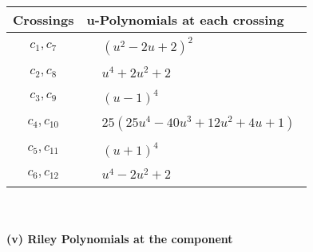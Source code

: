 \documentclass[1p]{elsarticle_modified}
\theoremstyle{definition}
\begin{document}
\begin{tabular}{m{50pt}|m{274pt}}
Crossings & \hspace{64pt}u-Polynomials at each crossing \\
\hline $$\begin{aligned}c_{1},c_{7}\end{aligned}$$&$\begin{aligned}
&(u^2-2 u+2)^2
\end{aligned}$\\
\hline $$\begin{aligned}c_{2},c_{8}\end{aligned}$$&$\begin{aligned}
&u^4+2 u^2+2
\end{aligned}$\\
\hline $$\begin{aligned}c_{3},c_{9}\end{aligned}$$&$\begin{aligned}
&(u-1)^4
\end{aligned}$\\
\hline $$\begin{aligned}c_{4},c_{10}\end{aligned}$$&$\begin{aligned}
&25(25 u^4-40 u^3+12 u^2+4 u+1)
\end{aligned}$\\
\hline $$\begin{aligned}c_{5},c_{11}\end{aligned}$$&$\begin{aligned}
&(u+1)^4
\end{aligned}$\\
\hline $$\begin{aligned}c_{6},c_{12}\end{aligned}$$&$\begin{aligned}
&u^4-2 u^2+2
\end{aligned}$\\
\hline
\end{tabular}\\~\\
\newpage\renewcommand{\arraystretch}{1}
\flushleft \textbf{(v) Riley Polynomials at the component}\newline \\
\end{document}
